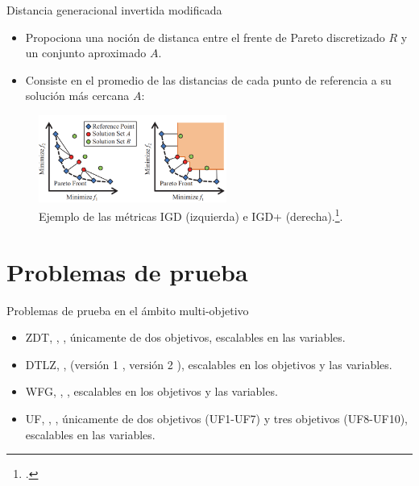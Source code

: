 \documentclass{beamer}
\begin{document}
\begin{frame}{Distancia generacional invertida modificada}
\begin{itemize}
\justifying
\scriptsize
\item Propociona una noción de distanca entre el frente de Pareto discretizado $R$ y un conjunto aproximado $A$.
\item Consiste en el promedio de las distancias de cada punto de referencia a su solución más cercana $A$:
\end{itemize}
\begin{table}[]
\end{table}
\begin{figure}[H]
\centering
\includegraphics[width=0.55\textwidth]{igd.png}
\caption{\scriptsize Ejemplo de las métricas IGD (izquierda) e IGD+ (derecha).\footcite{ishibuchi2016sensitivity}.}
\end{figure}
\end{frame}


\section{Problemas de prueba}
\begin{frame}{Problemas de prueba en el ámbito multi-objetivo}
\begin{itemize}
   \item ZDT, \citeauthor{Joel:ZDT}, \citeyear{Joel:ZDT}, únicamente de dos objetivos, escalables en las variables.
   \item DTLZ, \citeauthor{Joel:DTLZ_1}, (versión 1 \citeyear{Joel:DTLZ_1}, versión 2 \citeyear{Joel:DTLZ_2}), escalables en los objetivos y las variables.
   \item WFG, \citeauthor{Joel:WFG_Main}, \citeyear{Joel:WFG_Main}, escalables en los objetivos y las variables.
   \item UF, \citeauthor{Joel:CEC2009}, \citeyear{Joel:CEC2009}, únicamente de dos objetivos (UF1-UF7) y tres objetivos (UF8-UF10), escalables en las variables.
\end{itemize}
\end{frame}
\end{document}
